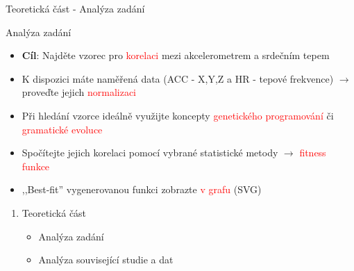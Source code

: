 \documentclass[aspectratio=169, xcolor=dvipsnames]{beamer}
\begin{document}
\begin{frame}{Teoretická část - Analýza zadání}
	\begin{block}{Analýza zadání}
    \pause
    \begin{itemize} 
      \item \textbf{Cíl}: Najděte vzorec pro \textcolor{Red}{korelaci} mezi akcelerometrem a srdečním tepem
        \pause
      \item K dispozici máte naměřená data (ACC - X,Y,Z a HR - tepové frekvence) $\to$ proveďte jejich \textcolor{Red}{normalizaci}
        \pause
      \item Při hledání vzorce ideálně využijte koncepty \textcolor{Red}{genetického programování} či \textcolor{Red}{gramatické evoluce}  
        \pause
      \item Spočítejte jejich korelaci pomocí vybrané statistické metody \pause $\to$ \textcolor{Red}{fitness funkce}
        \pause
      \item ,,Best-fit'' vygenerovanou funkci zobrazte \textcolor{Red}{v grafu} (SVG)
    \end{itemize}
	\end{block}
\end{frame}

\begin{frame}{}
	\begin{center}
\begin{enumerate}
    \item Teoretická část
      \begin{itemize}
        \item Analýza zadání 
        \item Analýza související studie a dat
       \end{itemize}
   \end{enumerate}
	\end{center}
\end{frame}
\end{document}
